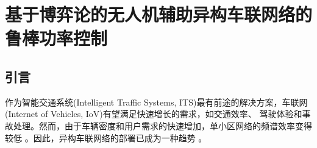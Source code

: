 \chapter{基于博弈论的无人机辅助异构车联网络的鲁棒功率控制}

\section{引言}\label{section2-1}
作为智能交通系统(Intelligent Traffic Systems, ITS)最有前途的解决方案，车联网(Internet of Vehicles, IoV)有望满足快速增长的需求，如交通效率、
驾驶体验和事故处理。然而，由于车辆密度和用户需求的快速增加，单小区网络的频谱效率变得较低 \supercite{TFL}。因此，异构车联网络的部署已成为一种趋势 \cite{ACAR}。

